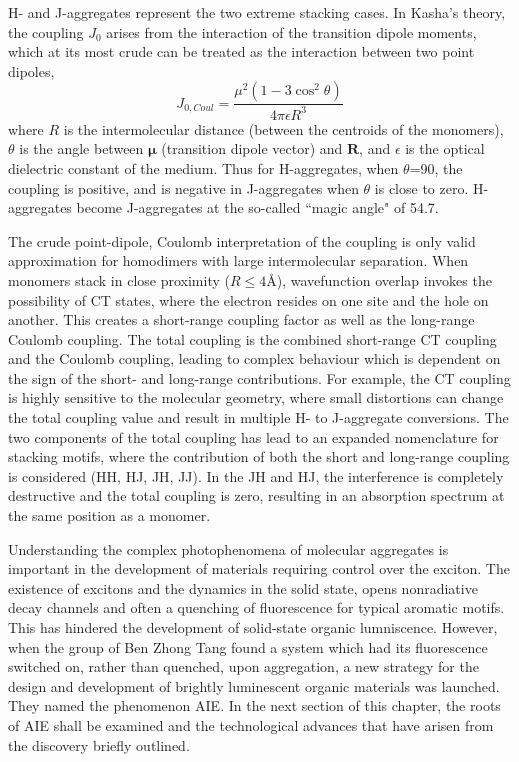 H- and J-aggregates represent the two extreme stacking cases. In Kasha's theory, the coupling $J_{0}$ arises from the interaction of the transition dipole moments, which at its most crude can be treated as the interaction between two point dipoles,
\begin{equation}
    J_{0,Coul}=\frac{\mu^{2}(1-3\cos^{2}\theta)}{4\pi\epsilon{}R^3}
\end{equation}
where $R$ is the intermolecular distance (between the centroids of the monomers), $\theta$ is the angle between  $\bm{\mu}$ (transition dipole vector) and $\bm{R}$, and $\epsilon$ is the optical dielectric constant of the medium. Thus for H-aggregates, when $\theta$=90\degree{}, the coupling is positive, and is negative in J-aggregates when $\theta$ is close to zero. H-aggregates become J-aggregates at the so-called ``magic angle" of 54.7\textdegree.\cite{Hestand2018}

The crude point-dipole, Coulomb interpretation of the coupling is only valid approximation for homodimers with large intermolecular separation.\cite{Kistler2013} When monomers stack in close proximity ($R\leq4\si{\angstrom}$), wavefunction overlap invokes the possibility of \ac{CT} states, where the electron resides on one site and the hole on another.\cite{Darghouth2018} This creates a short-range coupling factor as well as the long-range Coulomb coupling. The total coupling is the combined short-range \ac{CT} coupling and the Coulomb coupling, leading to complex behaviour which is dependent on the sign of the short- and long-range contributions. For example, the \ac{CT} coupling is highly sensitive to the molecular geometry, where small distortions can change the total coupling value and result in multiple H- to J-aggregate conversions.\cite{Arago2015} The two components of the total coupling has lead to an expanded nomenclature for stacking motifs, where the contribution of both the short and long-range coupling is considered (HH, HJ, JH, JJ). In the JH and HJ, the interference is completely destructive and the total coupling is zero, resulting in an absorption spectrum at the same position as a monomer.\cite{Hestand2017}

Understanding the complex photophenomena of molecular aggregates is important in the development of materials requiring control over the exciton. The existence of excitons and the dynamics in the solid state, opens nonradiative decay channels and often a quenching of fluorescence for typical aromatic motifs. This has hindered the development of solid-state organic lumniscence. However, when the group of Ben Zhong Tang found a system which had its fluorescence switched on, rather than quenched, upon aggregation, a new strategy for the design and development of brightly luminescent organic materials was launched. They named the phenomenon \acf{AIE}. In the next section of this chapter, the roots of \ac{AIE} shall be examined and the technological advances that have arisen from the discovery briefly outlined.

